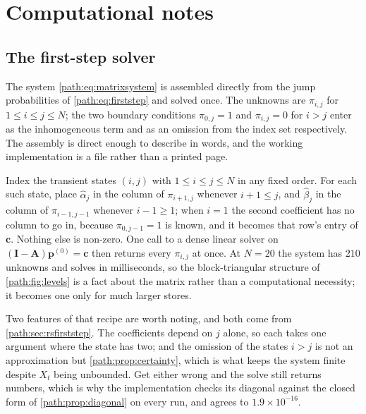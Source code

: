 
\section{Computational notes}
\label{path:app:computational}

\subsection{The first-step solver}
\label{path:app:solver}

The system \cref{path:eq:matrixsystem} is assembled directly from the jump
probabilities of \cref{path:eq:firststep} and solved once. The unknowns are
$\pi_{i,j}$ for $1\le i\le j\le N$; the two boundary conditions
$\pi_{0,j}=1$ and $\pi_{i,j}=0$ for $i>j$ enter as the inhomogeneous term
and as an omission from the index set respectively. The assembly is direct
enough to describe in words, and the working implementation is a file rather
than a printed page.

Index the transient states $(i,j)$ with $1\le i\le j\le N$ in any fixed
order. For each such state, place $\hat\alpha_j$ in the column of
$\pi_{i+1,j}$ whenever $i+1\le j$, and $\hat\beta_j$ in the column of
$\pi_{i-1,j-1}$ whenever $i-1\ge1$; when $i=1$ the second coefficient has no
column to go in, because $\pi_{0,j-1}=1$ is known, and it becomes that row's
entry of $\mathbf{c}$. Nothing else is non-zero. One call to a dense
linear solver on $(\mathbf{I}-\mathbf{A})\mathbf{p}^{(0)}=\mathbf{c}$
then returns every $\pi_{i,j}$ at once. At $N=20$ the system has $210$
unknowns and solves in milliseconds, so the block-triangular structure of
\cref{path:fig:levels} is a fact about the matrix rather than a
computational necessity; it becomes one only for much larger stores.

Two features of that recipe are worth noting, and both come from
\cref{path:sec:rsfirststep}. The coefficients depend on $j$ alone, so each
takes one argument where the state has two; and the omission of the states
$i>j$ is not an approximation but \cref{path:prop:certainty}, which is what
keeps the system finite despite $X_t$ being unbounded. Get either wrong and
the solve still returns numbers, which is why the implementation checks its
diagonal against the closed form of \cref{path:prop:diagonal} on every run,
and agrees to $1.9\times10^{-16}$.

